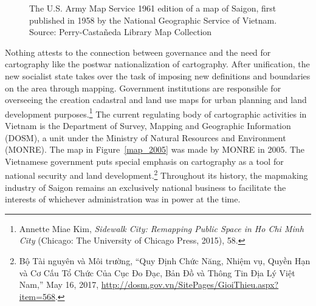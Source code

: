 \begin{figure}[!ht]\centering
\subfigure
{}
\qquad
\subfigure
{}
\vspace{-.3 in}
\caption[U.S. Army Map Service's 1961 map of Saigon]{The U.S. Army Map Service 1961 edition of a map of Saigon, first published in 1958 by the National Geographic Service of Vietnam. Source: Perry-Castañeda Library
Map Collection}\label{map_1961}
\end{figure}

\begin{figure}[!ht]
\end{figure}

\vi
Nothing attests to the connection between governance and the need for cartography like the postwar nationalization of cartography. After unification, the new socialist state takes over the task of imposing new definitions and boundaries on the area through mapping. Government institutions are responsible for overseeing the creation cadastral and land use maps for urban planning and land development purposes.\footnote{Annette Miae Kim, \textit{Sidewalk City: Remapping Public Space in Ho Chi Minh City} (Chicago: The University of Chicago Press, 2015), 58.} The current regulating body of cartographic activities in Vietnam is the Department of Survey, Mapping and Geographic Information (DOSM), a unit under the Ministry of Natural Resources and Environment (MONRE). The map in Figure~\ref{map_2005} was made by MONRE in 2005. The Vietnamese government puts special emphasis on cartography as a tool for national security and land development.\footnote{Bộ Tài nguyên và Môi trường, “Quy Định Chức Năng, Nhiệm vụ, Quyền Hạn và Cơ Cấu Tổ Chức Của Cục Đo Đạc, Bản Đồ và Thông Tin Địa Lý Việt Nam,” May 16, 2017, \url{http://dosm.gov.vn/SitePages/GioiThieu.aspx?item=568}.} Throughout its history, the mapmaking industry of Saigon remains an exclusively national business to facilitate the interests of whichever administration was in power at the time.

